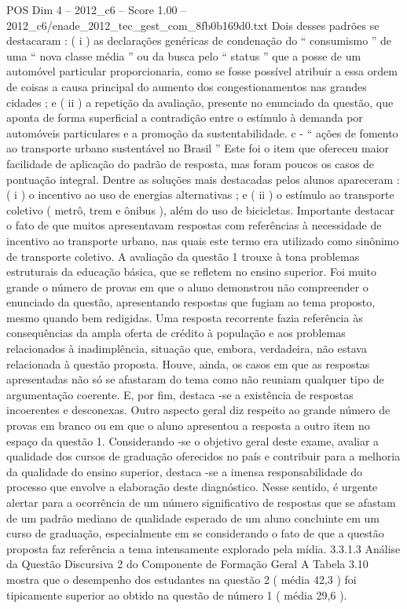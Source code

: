 \begin{textsample}{POS Dim 4 – 2012\_c6 – Score 1.00 – 2012\_c6/enade\_2012\_tec\_gest\_com\_8fb0b169d0.txt}
Dois desses padrões se destacaram : ( i ) as declarações genéricas de condenação do “ consumismo ” de uma “ nova classe média ” ou da busca pelo “ status ” que a posse de um automóvel particular proporcionaria, como se fosse possível atribuir a essa ordem de coisas a causa principal do aumento dos congestionamentos nas grandes cidades ; e ( ii ) a repetição da avaliação, presente no enunciado da questão, que aponta de forma superficial a contradição entre o estímulo à demanda por automóveis particulares e a promoção da sustentabilidade. c - “ ações de fomento ao transporte urbano sustentável no Brasil ” Este foi o item que ofereceu maior facilidade de aplicação do padrão de resposta, mas foram poucos os casos de pontuação integral.
Dentre as soluções mais destacadas pelos alunos apareceram : ( i ) o incentivo ao uso de energias alternativas ; e ( ii ) o estímulo ao transporte coletivo ( metrô, trem e ônibus ), além do uso de bicicletas.
Importante destacar o fato de que muitos apresentavam respostas com referências à necessidade de incentivo ao transporte urbano, nas quais este termo era utilizado como sinônimo de transporte coletivo.
A avaliação da questão 1 trouxe à tona problemas estruturais da educação básica, que se refletem no ensino superior.
Foi muito grande o número de provas em que o aluno demonstrou não compreender o enunciado da questão, apresentando respostas que fugiam ao tema proposto, mesmo quando bem redigidas.
Uma resposta recorrente fazia referência às consequências da ampla oferta de crédito à população e aos problemas relacionados à inadimplência, situação que, embora, verdadeira, não estava relacionada à questão proposta.
Houve, ainda, os casos em que as respostas apresentadas não só se afastaram do tema como não reuniam qualquer tipo de argumentação coerente.
E, por fim, destaca -se a existência de respostas incoerentes e desconexas.
Outro aspecto geral diz respeito ao grande número de provas em branco ou em que o aluno apresentou a resposta a outro item no espaço da questão 1.
Considerando -se o objetivo geral deste exame, avaliar a qualidade dos cursos de graduação oferecidos no país e contribuir para a melhoria da qualidade do ensino superior, destaca -se a imensa responsabilidade do processo que envolve a elaboração deste diagnóstico.
Nesse sentido, é urgente alertar para a ocorrência de um número significativo de respostas que se afastam de um padrão mediano de qualidade esperado de um aluno concluinte em um curso de graduação, especialmente em se considerando o fato de que a questão proposta faz referência a tema intensamente explorado pela mídia. 3.3.1.3 Análise da Questão Discursiva 2 do Componente de Formação Geral A Tabela 3.10 mostra que o desempenho dos estudantes na questão 2 ( média 42,3 ) foi tipicamente superior ao obtido na questão de número 1 ( média 29,6 ).

\end{textsample}
